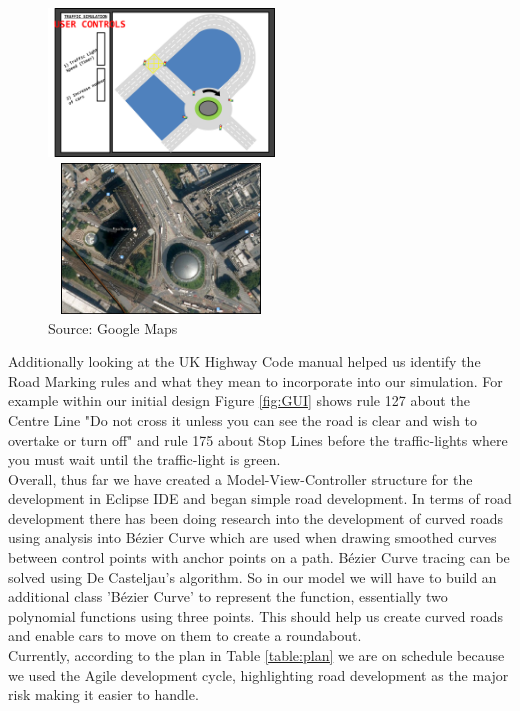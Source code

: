 \documentclass[a4paper,11pt]{article}
\begin{document}
\begin{figure}[ht]%
\centering
\begin{minipage}[b]{0.45\linewidth}
		\includegraphics[width=6cm,height=4cm]{UserControls.png} 
	\caption*{ }
	\label{fig:GUI}
\end{minipage}
\begin{minipage}[b]{0.45\linewidth}
	\includegraphics[width=6cm, height=4cm]{WATERLOO.png} 	
	\caption*{Source: Google Maps}
	\label{fig:Waterloo}
\end{minipage}

\end{figure}

Additionally looking at the UK Highway Code manual helped us identify the Road Marking rules and what they mean to  incorporate into our simulation. For example within our initial design Figure \ref{fig:GUI} shows rule 127 about the Centre Line "Do not cross it unless you can see the road is clear and wish to overtake or turn off" and rule 175 about Stop Lines before the traffic-lights where you must wait until the traffic-light is green.\\Overall, thus far we have created a Model-View-Controller structure for the development in Eclipse IDE and began simple road development. In terms of road development there has been doing research into the development of curved roads using analysis into B\'{e}zier Curve which are used when drawing smoothed curves between control points with anchor points on a path. B\'{e}zier Curve tracing can be solved using De Casteljau's algorithm. So in our model we will have to build an additional class 'B\'{e}zier Curve' to represent the function, essentially two polynomial functions using three points. This should help us create curved roads and enable cars to move on them to create a roundabout.\\Currently, according to the plan in Table \ref{table:plan} we are on schedule because we used the Agile development cycle, highlighting road development as the major risk making it easier to handle.
\end{document}
